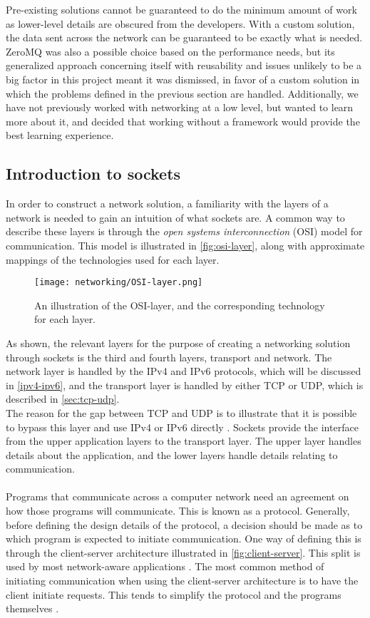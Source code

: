 Pre-existing solutions cannot be guaranteed to do the minimum amount of work as lower-level details are obscured from the developers.
With a custom solution, the data sent across the network can be guaranteed to be exactly what is needed.\\
ZeroMQ was also a possible choice based on the performance needs, but its generalized approach concerning itself with reusability and issues unlikely to be a big factor in this project meant it was dismissed, in favor of a custom solution in which the problems defined in the previous section are handled.
Additionally, we have not previously worked with networking at a low level, but wanted to learn more about it, and decided that working without a framework would provide the best learning experience.

\subsection{Introduction to sockets}
In order to construct a network solution, a familiarity with the layers of a network is needed to gain an intuition of what sockets are.
A common way to describe these layers is through the \textit{open systems interconnection} (OSI) model for communication.
This model is illustrated in \autoref{fig:osi-layer}, along with approximate mappings of the technologies used for each layer.
\begin{figure}[H]
    \centering
    \texttt{[image: networking/OSI-layer.png]}
    \caption{An illustration of the OSI-layer, and the corresponding technology for each layer.}
    \label{fig:osi-layer}
\end{figure}
\noindent
As shown, the relevant layers for the purpose of creating a networking solution through sockets is the third and fourth layers, transport and network.
The network layer is handled by the IPv4 and IPv6 protocols, which will be discussed in \autoref{ipv4-ipv6}, and the transport layer is handled by either TCP or UDP, which is described in \autoref{sec:tcp-udp}.\\
The reason for the gap between TCP and UDP is to illustrate that it is possible to bypass this layer and use IPv4 or IPv6 directly \cite{socketnetworking}.
Sockets provide the interface from the upper application layers to the transport layer.
The upper layer handles details about the application, and the lower layers handle details relating to communication.
\\\\
Programs that communicate across a computer network need an agreement on how those programs will communicate.
This is known as a protocol.
Generally, before defining the design details of the protocol, a decision should be made as to which program is expected to initiate communication.
One way of defining this is through the client-server architecture illustrated in \autoref{fig:client-server}.
This split is used by most network-aware applications \cite{socketnetworking}.
The most common method of initiating communication when using the client-server architecture is to have the client initiate requests.
This tends to simplify the protocol and the programs themselves \cite{socketnetworking}.

